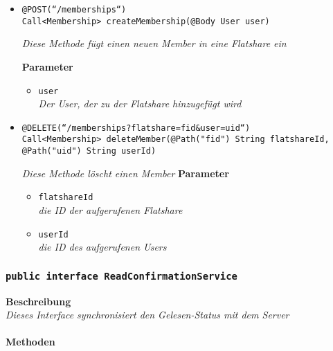 \begin{itemize}
      \item\texttt{{@POST(``/memberships``)\\ Call<Membership> createMembership(@Body User user)}}

		\textit{Diese Methode fügt einen neuen Member in eine Flatshare ein}        	
		
		\textbf{Parameter} 
			\begin{itemize}
				\item\texttt{user}\\
		 		\textit{ Der User, der zu der Flatshare hinzugefügt wird}
	 		\end{itemize}

	      \item\texttt{{@DELETE(``/memberships?flatshare={fid}\&user={uid}``)\\Call<Membership> deleteMember(@Path("fid") String flatshareId, @Path("uid") String userId)}}

		\textit{Diese Methode löscht einen Member}        	
		\textbf{Parameter} 
			\begin{itemize}
				\item\texttt{flatshareId}\\
		 		\textit{die ID der aufgerufenen Flatshare}
		 		\item\texttt{userId}\\
		 		\textit{die ID des aufgerufenen Users}
	 		\end{itemize}		

	 \end{itemize}

	\subsubsection{\texttt{public interface ReadConfirmationService }}
	\textbf{Beschreibung}\\
	\textit{Dieses Interface synchronisiert den Gelesen-Status mit dem Server}\\
\\
	\textbf{Methoden} 

